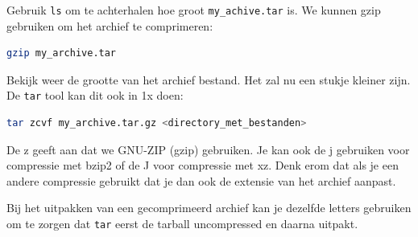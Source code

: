 Gebruik \texttt{ls} om te achterhalen hoe groot \texttt{my\_achive.tar} is. We kunnen gzip gebruiken om het archief te comprimeren:
\begin{lstlisting}[language=bash]
gzip my_archive.tar
\end{lstlisting}
Bekijk weer de grootte van het archief bestand. Het zal nu een stukje kleiner zijn. De \texttt{tar} tool kan dit ook in 1x doen:
\begin{lstlisting}[language=bash]
tar zcvf my_archive.tar.gz <directory_met_bestanden>
\end{lstlisting}
De z geeft aan dat we GNU-ZIP (gzip) gebruiken. Je kan ook de j gebruiken voor compressie met bzip2 of de J voor compressie met xz. Denk erom dat als je een andere compressie gebruikt dat je dan ook de extensie van het archief aanpast.

Bij het uitpakken van een gecomprimeerd archief kan je dezelfde letters gebruiken om te zorgen dat \texttt{tar} eerst de tarball uncompressed en daarna uitpakt.

